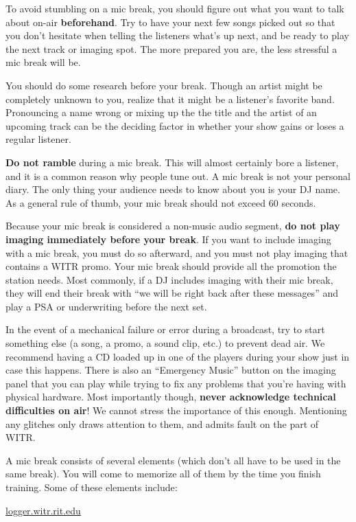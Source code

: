 \documentclass{witrman}
\begin{document}
To avoid stumbling on a mic break, you should figure out what you want to talk
about on-air \textbf{beforehand}.  Try to have your next few songs picked out so
that you don't hesitate when telling the listeners what's up next, and be ready
to play the next track or imaging spot.  The more prepared you are, the less
stressful a mic break will be.

You should do some research before your break.  Though an artist might be
completely unknown to you, realize that it might be a listener's favorite band.
Pronouncing a name wrong or mixing up the the title and the artist of an
upcoming track can be the deciding factor in whether your show gains or loses a
regular listener.

\textbf{Do not ramble} during a mic break.  This will almost certainly bore a
listener, and it is a common reason why people tune out.  A mic break is not
your personal diary.  The only thing your audience needs to know about you is
your DJ name.  As a general rule of thumb, your mic break should not exceed 60
seconds.

Because your mic break is considered a non-music audio segment, \textbf{do not
play imaging immediately before your break}.  If you want to include imaging
with a mic break, you must do so afterward, and you must not play imaging that
contains a WITR promo.  Your mic break should provide all the promotion the
station needs.  Most commonly, if a DJ includes imaging with their mic break,
they will end their break with ``we will be right back after these messages''
and play a PSA or underwriting before the next set.

In the event of a mechanical failure or error during a broadcast, try to start
something else (a song, a promo, a sound clip, etc.) to prevent dead air.  We
recommend having a CD loaded up in one of the players during your show just in
case this happens.  There is also an ``Emergency Music'' button on the imaging
panel that you can play while trying to fix any problems that you're having with
physical hardware.  Most importantly though, \textbf{never acknowledge technical
difficulties on air}!  We cannot stress the importance of this enough.
Mentioning any glitches only draws attention to them, and admits fault on the
part of WITR\@.

A mic break consists of several elements (which don't all have to be used in
the same break).  You will come to memorize all of them by the time you finish
training.  Some of these elements include:
\begin{tightitemize}
        {\href{https://logger.witr.rit.edu/}{logger.witr.rit.edu}}
\end{tightitemize}
\end{document}
